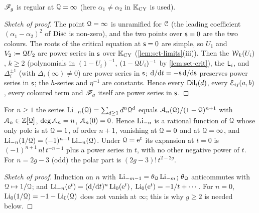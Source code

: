 \begin{lem}
\label{lem:rig-inf}
$\mathscr{F}_g$ is regular at $\mathcal{Q}=\infty$ (here $\alpha_1\neq\alpha_2$ in $\mathbb{K}_{\mathrm{CY}}$ is used).
\end{lem}

\begin{proof}[Sketch of proof]
The point $\mathcal{Q}=\infty$ is unramified for $\mathcal{C}$ (the leading coefficient $(\alpha_1-\alpha_2)^2$ of $\operatorname{Disc}$ is non-zero), and the two points over $\mathsf{s}=0$ are the two colours. The roots of the critical equation at $\mathsf{s}=0$ are simple, so $U_1$ and $V_2\coloneqq\mathcal{Q} U_2$ are power series in $\mathsf{s}$ over $\mathbb{K}_{\mathrm{CY}}$ (\cref{lem:set-limits}(iii)). Then the $\mathcal{W}_k(U_i)$, $k\geq2$ (polynomials in $(1-U_i)^{-1}$, $(1-\mathcal{Q} U_i)^{-1}$ by \cref{lem:set-crit}), the $\mathsf{L}_i$, and $\Delta_i^{\pm1}$ (with $\Delta_i(\infty)\neq0$) are power series in $\mathsf{s}$; $\mathrm{d}/\mathrm{d} t=-\mathsf{s}\,\mathrm{d}/\mathrm{d}\mathsf{s}$ preserves power series in $\mathsf{s}$; the $h$-series and $\eta^{-1}$ are constants. Hence every $\mathsf{Dil}_i(d)$, every $\mathcal{E}_{ij}(a,b)$, every coloured term and $\mathscr{F}_g$ itself are power series in $\mathsf{s}$.
\end{proof}

\begin{lem}
\label{lem:rig-li}
For $n\geq 1$ the series $\operatorname{Li}_{-n}(\mathcal{Q})=\sum_{d\geq1}d^n\mathcal{Q}^d$ equals $\mathcal{A}_n(\mathcal{Q})/(1-\mathcal{Q})^{n+1}$ with $\mathcal{A}_n\in\mathbb{Z}[\mathcal{Q}]$, $\deg\mathcal{A}_n=n$, $\mathcal{A}_n(0)=0$. Hence $\operatorname{Li}_{-n}$ is a rational function of $\mathcal{Q}$ whose only pole is at $\mathcal{Q}=1$, of order $n+1$, vanishing at $\mathcal{Q}=0$ and at $\mathcal{Q}=\infty$, and $\operatorname{Li}_{-n}(1/\mathcal{Q})=(-1)^{n+1}\operatorname{Li}_{-n}(\mathcal{Q})$. Under $\mathcal{Q}=\mathrm{e}^{t}$ its expansion at $t=0$ is $(-1)^{n+1}\,n!\,t^{-n-1}$ plus a power series in $t$, with no other negative power of $t$. For $n=2g-3$ (odd) the polar part is $(2g-3)!\,t^{2-2g}$.
\end{lem}

\begin{proof}[Sketch of proof]
Induction on $n$ with $\operatorname{Li}_{-m-1}=\theta_{\mathcal{Q}}\operatorname{Li}_{-m}$; $\theta_{\mathcal{Q}}$ anticommutes with $\mathcal{Q}\mapsto1/\mathcal{Q}$; and $\operatorname{Li}_{-n}(\mathrm{e}^t)=(\mathrm{d}/\mathrm{d} t)^n\operatorname{Li}_0(\mathrm{e}^t)$, $\operatorname{Li}_0(\mathrm{e}^t)=-1/t+\cdots$. For $n=0$, $\operatorname{Li}_0(1/\mathcal{Q})=-1-\operatorname{Li}_0(\mathcal{Q})$ does not vanish at $\infty$; this is why $g\geq2$ is needed below.
\end{proof}

